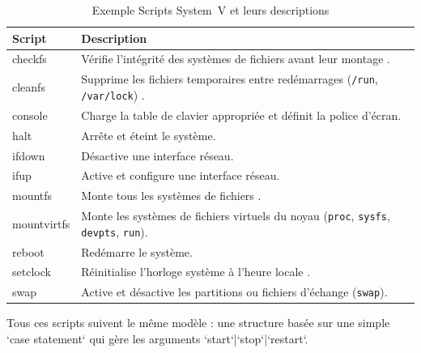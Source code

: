 \begin{table}[H]
  \centering
  \caption{Exemple Scripts System V et leurs descriptions}
  \label{tab:sysv-scripts}
  \begin{tabularx}{\linewidth}{|l|X|}
    \toprule
    \textbf{Script} & \textbf{Description} \\
    \midrule
    checkfs      & Vérifie l’intégrité des systèmes de fichiers avant leur montage . \\ \hline
    cleanfs      & Supprime les fichiers temporaires entre redémarrages (\texttt{/run}, \texttt{/var/lock}) . \\ \hline
    console      & Charge la table de clavier appropriée et définit la police d’écran. \\ \hline
    halt         & Arrête et éteint le système. \\ \hline
    ifdown       & Désactive une interface réseau. \\ \hline
    ifup         & Active et configure une interface réseau.  \\ \hline
    mountfs      & Monte tous les systèmes de fichiers . \\ \hline
    mountvirtfs  & Monte les systèmes de fichiers virtuels du noyau (\texttt{proc}, \texttt{sysfs}, \texttt{devpts}, \texttt{run}). \\ \hline
    reboot       & Redémarre le système. \\ \hline
    setclock     & Réinitialise l’horloge système à l’heure locale . \\ \hline
    swap         & Active et désactive les partitions ou fichiers d’échange (\texttt{swap}). \\ \hline
     
    \bottomrule
  \end{tabularx}
\end{table}

Tous ces scripts suivent le même modèle : une structure basée sur une simple  `case statement` qui gère les arguments `start`|`stop`|`restart`.  

